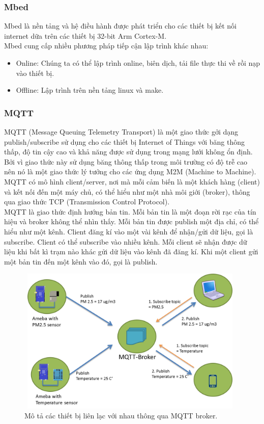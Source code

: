 \documentclass[a4paper,12pt,oneside]{article}
\begin{document}
\subsubsection{Mbed}
\noindent Mbed là nền tảng và hệ điều hành được phát triển cho các thiết bị kết nối internet dữa trên các thiết bị 32-bit Arm Cortex-M.\\
\noindent Mbed cung cấp nhiều phương pháp tiếp cận lập trình khác nhau:
\begin{itemize}
	\item Online: Chúng ta có thể lập trình online, biên dịch, tải file thực thi về rồi nạp vào thiết bị.
	\item Offline: Lập trình trên nền tảng linux và make.
\end{itemize}

\subsubsection{MQTT}
\noindent MQTT (Message Queuing Telemetry Transport) là một giao thức gởi dạng publish/subscribe sử dụng cho các thiết bị Internet of Things với băng thông thấp, độ tin cậy cao và khả năng được sử dụng trong mạng lưới không ổn định.
Bởi vì giao thức này sử dụng băng thông thấp trong môi trường có độ trễ cao nên nó là một giao thức lý tưởng cho các ứng dụng M2M (Machine to Machine).\\
 MQTT có mô hình client/server, nơi mà mỗi cảm biến là một khách hàng (client) và kết nối đến một máy chủ, có thể hiểu như một nhà môi giới (broker), thông qua giao thức TCP (Transmission Control Protocol).\\
 MQTT là giao thức định hướng bản tin. Mỗi bản tin là một đoạn rời rạc của tín hiệu và broker không thể nhìn thấy.
Mỗi bản tin được publish một địa chỉ, có thể hiểu như một kênh. Client đăng kí vào một vài kênh để nhận/gửi dữ liệu, gọi là subscribe. Client có thể subscribe vào nhiều kênh. Mỗi client sẽ nhận được dữ liệu khi bất kì trạm nào khác gửi dữ liệu vào kênh đã đăng kí. Khi một client gửi một bản tin đến một kênh vào đó, gọi là publish.
\begin{center}
\begin{figure}[htp]
\begin{center}
\includegraphics[height=7cm,width=11cm]{hinh/mqtt.png}
\end{center}
\caption{Mô tả các thiết bị liên lạc với nhau thông qua MQTT broker.}
\end{figure}
\end{center}
\end{document}
